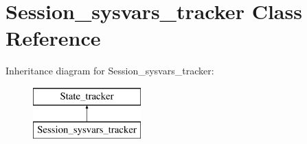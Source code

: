 \hypertarget{classSession__sysvars__tracker}{}\section{Session\+\_\+sysvars\+\_\+tracker Class Reference}
\label{classSession__sysvars__tracker}
Inheritance diagram for Session\+\_\+sysvars\+\_\+tracker\+:\begin{figure}[H]
\begin{center}
\leavevmode
\includegraphics[height=2.000000cm]{classSession__sysvars__tracker}
\end{center}
\end{figure}
